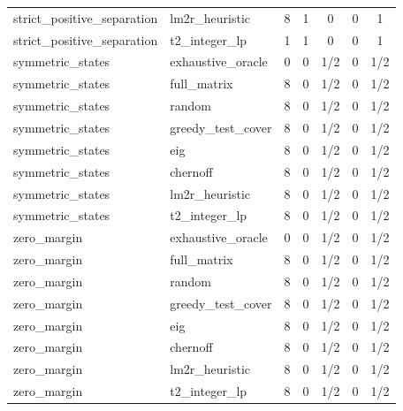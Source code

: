 \begin{table}[p]
\begin{tabular}{@{}llccccc@{}}
strict\_positive\_separation & lm2r\_heuristic & 8 & 1 & 0 & 0 & 1 \\
strict\_positive\_separation & t2\_integer\_lp & 1 & 1 & 0 & 0 & 1 \\
symmetric\_states & exhaustive\_oracle & 0 & 0 & 1/2 & 0 & 1/2 \\
symmetric\_states & full\_matrix & 8 & 0 & 1/2 & 0 & 1/2 \\
symmetric\_states & random & 8 & 0 & 1/2 & 0 & 1/2 \\
symmetric\_states & greedy\_test\_cover & 8 & 0 & 1/2 & 0 & 1/2 \\
symmetric\_states & eig & 8 & 0 & 1/2 & 0 & 1/2 \\
symmetric\_states & chernoff & 8 & 0 & 1/2 & 0 & 1/2 \\
symmetric\_states & lm2r\_heuristic & 8 & 0 & 1/2 & 0 & 1/2 \\
symmetric\_states & t2\_integer\_lp & 8 & 0 & 1/2 & 0 & 1/2 \\
zero\_margin & exhaustive\_oracle & 0 & 0 & 1/2 & 0 & 1/2 \\
zero\_margin & full\_matrix & 8 & 0 & 1/2 & 0 & 1/2 \\
zero\_margin & random & 8 & 0 & 1/2 & 0 & 1/2 \\
zero\_margin & greedy\_test\_cover & 8 & 0 & 1/2 & 0 & 1/2 \\
zero\_margin & eig & 8 & 0 & 1/2 & 0 & 1/2 \\
zero\_margin & chernoff & 8 & 0 & 1/2 & 0 & 1/2 \\
zero\_margin & lm2r\_heuristic & 8 & 0 & 1/2 & 0 & 1/2 \\
zero\_margin & t2\_integer\_lp & 8 & 0 & 1/2 & 0 & 1/2 \\
\bottomrule
\end{tabular}
\end{table}